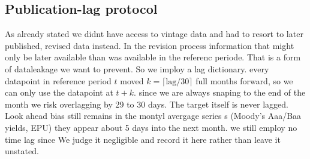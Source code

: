 \subsection{Publication-lag protocol}
\label{sec:data:lags}

As already stated we didnt have access to vintage data and had to resort to later published, revised data instead. In the revision process information that might only be later available than was available in the referenc periode. That is a form of dataleakage we want to prevent. So we imploy a lag dictionary. every datapoint in reference period $t$ moved $k=\lceil \text{lag}/30\rceil$ full months forward, so we can only use the datapoint at $t + k$. since we are always snaping to the end of the month we risk overlagging by 29 to 30 days. The target itself is never lagged. Look ahead bias still remains in the montyl avergage series s (Moody’s Aaa/Baa yields, EPU) they appear about 5 days into the next month. we still employ no time lag since We judge
it negligible and record it here rather than leave it unstated.


